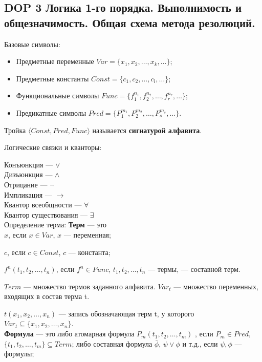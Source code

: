 \subsection*{DOP 3 Логика 1-го порядка.  Выполнимость и общезначимость. Общая схема метода резолюций.}

Базовые символы: 
\begin{itemize}
    \item Предметные переменные $Var = \{x_1, x_2, \ldots, x_k, \ldots\}$;
    \item Предметные константы $Const = \{c_1, c_2,\ldots, c_l,\ldots\}$;
    \item Функциональные символы $Func = \{f^{n_1}_1,f^{n_2}_2,\ldots, f^{n_r}_r,\ldots\}$;
    \item Предикатные символы $Pred = \{P^{m_1}_1,P^{m_2}_2, \ldots, P^{m_s}_s,\ldots\}$.
\end{itemize}
Тройка $\langle Const,Pred,Func\rangle$ называется \textbf{сигнатурой алфавита}.

Логические связки и кванторы: 

Конъюнкция --- $\vee$ \\
Дизъюнкция --- $ \wedge $ \\
Отрицание --- $ \lnot $ \\
Импликация --- $ \longrightarrow $ \\
Квантор всеобщности --- $ \forall $ \\
Квантор существования --- $\exists$ \\


Определение терма: 
\textbf{Терм} --- это \\
$x$, если $x \in Var$, $x$ --- переменная;

$c$, если $c \in Const$, $c$ --- константа;

$f^n(t_1, t_2,\ldots, t_n)$,  если $f^n \in Func$, $t_1, t_2,\ldots, t_n$ --- термы, --- составной терм.

$Term$ --- множество термов заданного алфавита.
$Var_t$ --- множество переменных, входящих в состав терма t.

$t(x_1, x_2,\ldots, x_n)$ --- запись обозначающая терм t, у которого ${Var}_t \subseteq \{x_1, x_2,\ldots, x_n\}$.\\

\textbf{Формула} --- это либо атомарная формула
$P_m(t_1, t_2,\ldots, t_m)$ , если $ P_m \in Pred $, $\{t_1, t_2,\ldots, t_m\} \subseteq Term $; 
либо составная формула
$\bar{\phi}$, $\psi \vee \phi$ и т.д., если $\psi, \phi$ — формулы; 

